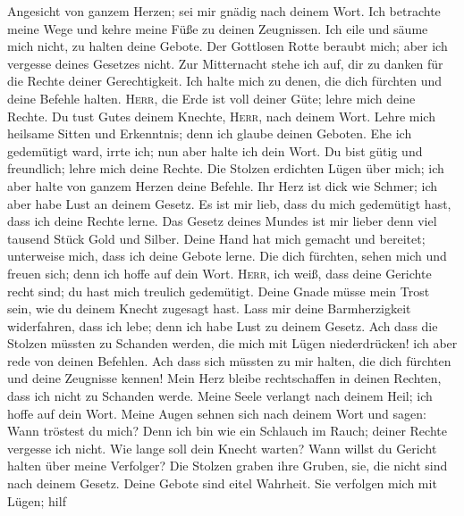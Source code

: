 Angesicht von ganzem Herzen; sei mir gnädig nach deinem Wort.
 Ich betrachte meine Wege und kehre meine Füße zu deinen
Zeugnissen.  Ich eile und säume mich nicht, zu halten
deine Gebote.  Der Gottlosen Rotte beraubt mich; aber ich
vergesse deines Gesetzes nicht.  Zur Mitternacht stehe
ich auf, dir zu danken für die Rechte deiner Gerechtigkeit.
 Ich halte mich zu denen, die dich fürchten und deine
Befehle halten.  \textsc{Herr}, die Erde ist voll deiner
Güte; lehre mich deine Rechte.  Du tust Gutes deinem
Knechte, \textsc{Herr}, nach deinem Wort.  Lehre mich
heilsame Sitten und Erkenntnis; denn ich glaube deinen Geboten.
 Ehe ich gedemütigt ward, irrte ich; nun aber halte ich
dein Wort.  Du bist gütig und freundlich; lehre mich
deine Rechte.  Die Stolzen erdichten Lügen über mich; ich
aber halte von ganzem Herzen deine Befehle.  Ihr Herz ist
dick wie Schmer; ich aber habe Lust an deinem Gesetz.  Es
ist mir lieb, dass du mich gedemütigt hast, dass ich deine Rechte lerne.
 Das Gesetz deines Mundes ist mir lieber denn viel
tausend Stück Gold und Silber.  Deine Hand hat mich
gemacht und bereitet; unterweise mich, dass ich deine Gebote lerne.
 Die dich fürchten, sehen mich und freuen sich; denn ich
hoffe auf dein Wort.  \textsc{Herr}, ich weiß, dass deine
Gerichte recht sind; du hast mich treulich gedemütigt. 
Deine Gnade müsse mein Trost sein, wie du deinem Knecht zugesagt hast.
 Lass mir deine Barmherzigkeit widerfahren, dass ich
lebe; denn ich habe Lust zu deinem Gesetz.  Ach dass die
Stolzen müssten zu Schanden werden, die mich mit Lügen niederdrücken!
ich aber rede von deinen Befehlen.  Ach dass sich müssten
zu mir halten, die dich fürchten und deine Zeugnisse kennen!
 Mein Herz bleibe rechtschaffen in deinen Rechten, dass
ich nicht zu Schanden werde.  Meine Seele verlangt nach
deinem Heil; ich hoffe auf dein Wort.  Meine Augen sehnen
sich nach deinem Wort und sagen: Wann tröstest du mich? 
Denn ich bin wie ein Schlauch im Rauch; deiner Rechte vergesse ich
nicht.  Wie lange soll dein Knecht warten? Wann willst du
Gericht halten über meine Verfolger?  Die Stolzen graben
ihre Gruben, sie, die nicht sind nach deinem Gesetz. 
Deine Gebote sind eitel Wahrheit. Sie verfolgen mich mit Lügen; hilf
